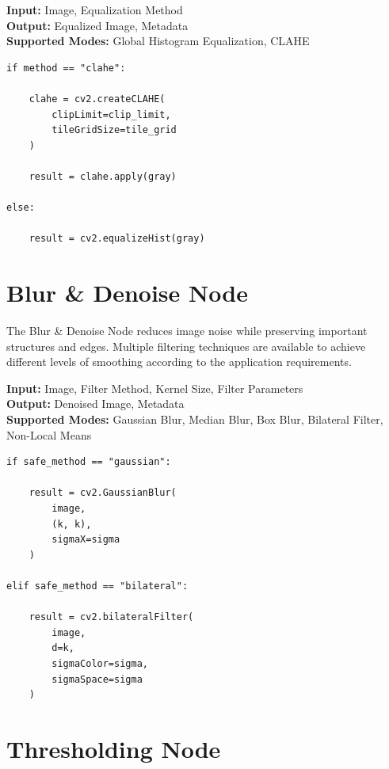 \documentclass[a4paper,12pt]{report}
\begin{document}
\noindent \textbf{Input:} Image, Equalization Method \\
\textbf{Output:} Equalized Image, Metadata \\
\textbf{Supported Modes:} Global Histogram Equalization, CLAHE

\begin{lstlisting}[caption={Core Algorithm}, label={lst:histogram-equalization-node}]
if method == "clahe":

    clahe = cv2.createCLAHE(
        clipLimit=clip_limit,
        tileGridSize=tile_grid
    )

    result = clahe.apply(gray)

else:

    result = cv2.equalizeHist(gray)
\end{lstlisting}

\section{Blur \& Denoise Node}
\label{sec:blur-denoise-node}

The Blur \& Denoise Node reduces image noise while preserving important
structures and edges. Multiple filtering techniques are available to
achieve different levels of smoothing according to the application
requirements.

\noindent \textbf{Input:} Image, Filter Method, Kernel Size, Filter Parameters \\
\textbf{Output:} Denoised Image, Metadata \\
\textbf{Supported Modes:} Gaussian Blur, Median Blur, Box Blur, Bilateral Filter, Non-Local Means

\begin{lstlisting}[caption={Core Algorithm}, label={lst:blur-denoise-node}]
if safe_method == "gaussian":

    result = cv2.GaussianBlur(
        image,
        (k, k),
        sigmaX=sigma
    )

elif safe_method == "bilateral":

    result = cv2.bilateralFilter(
        image,
        d=k,
        sigmaColor=sigma,
        sigmaSpace=sigma
    )
\end{lstlisting}

\section{Thresholding Node}
\label{sec:thresholding-node}
\end{document}
